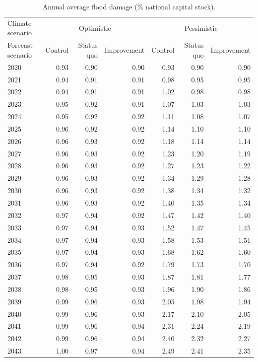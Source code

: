 \begin{table}
\caption{Annual average flood damage (\% national capital stock).}
\label{tab:drr_impact_channel_KHM}
\centering
\begin{tabular}{lrrrrrr}
\toprule
Climate scenario & \multicolumn{3}{c}{Optimistic} & \multicolumn{3}{c}{Pessimistic} \\
Forecast scenario & Control & Status quo & Improvement & Control & Status quo & Improvement \\
\midrule
2020 & 0.93 & 0.90 & 0.90 & 0.93 & 0.90 & 0.90 \\
2021 & 0.94 & 0.91 & 0.91 & 0.98 & 0.95 & 0.95 \\
2022 & 0.94 & 0.91 & 0.91 & 1.02 & 0.98 & 0.98 \\
2023 & 0.95 & 0.92 & 0.91 & 1.07 & 1.03 & 1.03 \\
2024 & 0.95 & 0.92 & 0.92 & 1.11 & 1.08 & 1.07 \\
2025 & 0.96 & 0.92 & 0.92 & 1.14 & 1.10 & 1.10 \\
2026 & 0.96 & 0.93 & 0.92 & 1.18 & 1.14 & 1.14 \\
2027 & 0.96 & 0.93 & 0.92 & 1.23 & 1.20 & 1.19 \\
2028 & 0.96 & 0.93 & 0.92 & 1.27 & 1.23 & 1.22 \\
2029 & 0.96 & 0.93 & 0.92 & 1.34 & 1.29 & 1.28 \\
2030 & 0.96 & 0.93 & 0.92 & 1.38 & 1.34 & 1.32 \\
2031 & 0.96 & 0.93 & 0.92 & 1.40 & 1.35 & 1.34 \\
2032 & 0.97 & 0.94 & 0.92 & 1.47 & 1.42 & 1.40 \\
2033 & 0.97 & 0.94 & 0.93 & 1.52 & 1.47 & 1.45 \\
2034 & 0.97 & 0.94 & 0.93 & 1.58 & 1.53 & 1.51 \\
2035 & 0.97 & 0.94 & 0.93 & 1.68 & 1.62 & 1.60 \\
2036 & 0.97 & 0.94 & 0.92 & 1.79 & 1.73 & 1.70 \\
2037 & 0.98 & 0.95 & 0.93 & 1.87 & 1.81 & 1.77 \\
2038 & 0.98 & 0.95 & 0.93 & 1.96 & 1.90 & 1.86 \\
2039 & 0.99 & 0.96 & 0.93 & 2.05 & 1.98 & 1.94 \\
2040 & 0.99 & 0.96 & 0.93 & 2.17 & 2.10 & 2.05 \\
2041 & 0.99 & 0.96 & 0.94 & 2.31 & 2.24 & 2.19 \\
2042 & 0.99 & 0.96 & 0.94 & 2.40 & 2.32 & 2.27 \\
2043 & 1.00 & 0.97 & 0.94 & 2.49 & 2.41 & 2.35 \\

\end{tabular}
\end{table}
